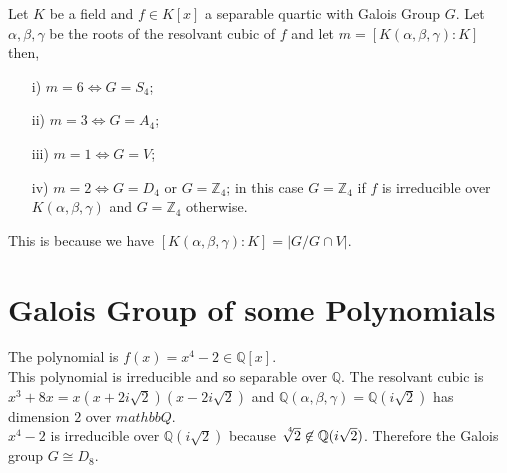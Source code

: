 \begin{theorem}
  Let \(K\) be a field and \(f \in K[x]\) a separable quartic with Galois Group \(G\). Let \(\alpha, \beta, \gamma\) be the roots of the resolvant cubic of \(f\) and let \(m= [K(\alpha, \beta, \gamma) : K]\) then,
\begin{enumerate}
\item[i)] \(m=6 \Longleftrightarrow G=S_4\);
\item[ii)] \(m=3 \Longleftrightarrow G=A_4\);
\item[iii)] \(m=1 \Longleftrightarrow G=V\);
\item[iv)] \(m=2 \Longleftrightarrow G=D_4\) or \(G={\mathbb{Z}}_4\); in this case \(G={\mathbb{Z}}_4\) if \(f\) is irreducible over \(K(\alpha, \beta, \gamma)\) and \(G={\mathbb{Z}}_4\) otherwise.
  \end{enumerate}
\end{theorem}
This is because we have \([K(\alpha,\beta,\gamma):K] = |G/G \cap V|\).

\section{Galois Group of some Polynomials}

\begin{example}
The polynomial is \(f(x)=x^4-2 \in \mathbb{Q}[x]\).\\
This polynomial is irreducible and so separable over \(\mathbb{Q}\). The resolvant cubic is \(x^3+8x = x(x+2i\sqrt{2})(x-2i\sqrt{2})\) and 
\(\mathbb{Q}(\alpha,\beta, \gamma)=\mathbb{Q}(i\sqrt{2})\) has dimension \(2\) over \(mathbb{Q}\).\\
\(x^4-2\) is irreducible over \(\mathbb{Q}(i\sqrt{2})\) because \(\sqrt[\leftroot{-3}\uproot{3}4]{2} \not\in \mathbb{Q}(i\sqrt{2})\). 
Therefore the Galois group \(G \cong D_8\).
\end{example}

